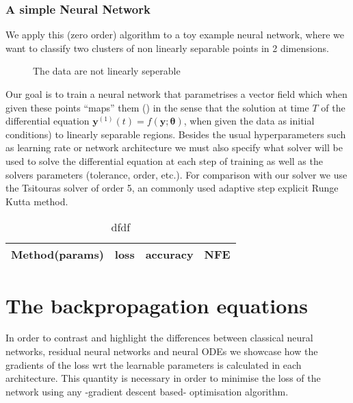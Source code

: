 \documentclass[11pt]{report}
\begin{document}
    \subsection{A simple Neural Network}
    We apply this (zero order) algorithm to a toy example neural network, where we want to classify two clusters of
    non linearly separable points in 2 dimensions.

    \begin{figure}[H]
        \begin{center}
            
        \end{center}
        \caption{The data are not linearly seperable}
        \label{fig:moons}
    \end{figure}

    Our goal is to train a neural network that parametrises a vector field which when given these points ``maps'' them ()
    in the sense that the solution at time $T$ of the differential equation
    $\pmb{y}^{(1)}(t) = f(\pmb{y}; \pmb{\theta})$, when given the data as initial conditions) to linearly separable regions.
    Besides the usual hyperparameters such as learning rate or network architecture we must also specify what solver will
    be used to solve the differential equation at each step of training as well as the solvers parameters
    (tolerance, order, etc.).
    For comparison with our solver we use the Tsitouras solver of order 5, an commonly used adaptive step explicit
    Runge Kutta method.


    \begin{table}[!h]
        \begin{center}
            \caption{dfdf}
            \label{moons_metics}
            \renewcommand{\arraystretch}{1.5}
            \renewcommand{\tabcolsep}{10.25pt}
            \begin{tabular}{|c|c|c|c|}
                \hline
                Method(params) & loss & accuracy & NFE \\
                \hline
            \end{tabular}
        \end{center}
    \end{table}








    \newpage
    \printbibliography

    \appendix


    \chapter{The backpropagation equations}
    In order to contrast and highlight the differences between classical neural networks, residual neural networks and
    neural ODEs we showcase how the gradients of the loss wrt the learnable parameters is calculated in each architecture.
    This quantity is necessary in order to minimise the loss of the network using any -gradient descent based- optimisation algorithm.
\end{document}
